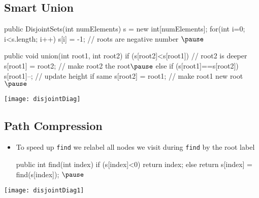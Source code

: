 \begin{slide}
\section[-2]{Smart Union}

\begin{PauseHighLight}
\begin{java}
    public DisjointSets(int numElements)
    {
        s = new int[numElements];
        for(int i=0; i<s.length; i++)
            s[i] = -1;                   // roots are negative number
    }$\pause$

    public void union(int root1, int root2)
    {
        if (s[root2]<s[root1]) {         // root2 is deeper
            s[root1] = root2;            // make root2 the root$\pause$
        } else {
            if (s[root1]==s[root2])      
                s[root1]--;              // update height if same
            s[root2] = root1;            // make root1 new root
        }
    }$\pause$
\end{java}
\begin{center}
  \texttt{[image: disjointDiag]}
\end{center}
\end{PauseHighLight}
\end{slide}


\begin{slide}
\section{Path Compression}

\begin{PauseHighLight}
  \begin{itemize}
  \item To speed up \texttt{find} we relabel all nodes we visit during
    \texttt{find} by the root label\pause
    \begin{java}
    public int find(int index)
    {
        if (s[index]<0)
            return index;
        else
            return s[index] = find(s[index]);
    }$\pause$
    \end{java}
  \end{itemize}
  \begin{center}
    \texttt{[image: disjointDiag1]}
  \end{center}
\end{PauseHighLight}

\end{slide}

